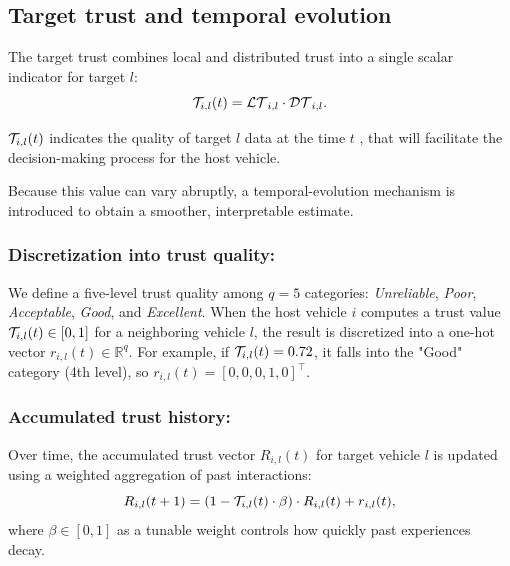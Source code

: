 \subsection{Target trust and temporal evolution}\label{subsec_evolution}
\vspace*{-0.2cm}
The target trust combines local and distributed trust into a single scalar indicator for target $l$: 
\begin{equation}
    \mathcal{T}_{i,l}(t) =  \mathcal{LT}_{i,l} \cdot \mathcal{DT}_{i,l}. 
    \label{trs_sample_genral}
\end{equation}

$\mathcal{T}_{i,l}(t)$ indicates the quality of target $l$ data at the time $t$ , that will facilitate the decision-making process for the host vehicle.

Because this value can vary abruptly, a temporal-evolution mechanism is introduced to obtain a smoother, interpretable estimate.
\subsubsection{Discretization into trust quality:}
We define a five-level trust quality among $q = 5$ categories: \textit{Unreliable}, \textit{Poor}, \textit{Acceptable}, \textit{Good}, and \textit{Excellent}. When the host vehicle $i$ computes a trust value $\mathcal{T}_{i,l}(t) \in [0, 1]$ for a neighboring vehicle $l$, the result is discretized into a one-hot vector $r_{i,l}(t) \in \mathbb{R}^q$. For example, if $\mathcal{T}_{i,l}(t) = 0.72$, it falls into the "Good" category (4th level), so $r_{i,l}(t) = [0, 0, 0, 1, 0]^{\top}$.
\subsubsection{Accumulated trust history:}
Over time, the accumulated trust vector $R_{i,l}(t)$ for target vehicle $l$ is updated using a weighted aggregation of past interactions: 
\begin{equation}
    R_{i,l}(t + 1) = \left(1 - \mathcal{T}_{i,l}(t) \cdot \beta \right) \cdot R_{i,l}(t) + r_{i,l}(t),
\end{equation}
where $\beta \in [0, 1]$ as a tunable weight controls how quickly past experiences decay. 

